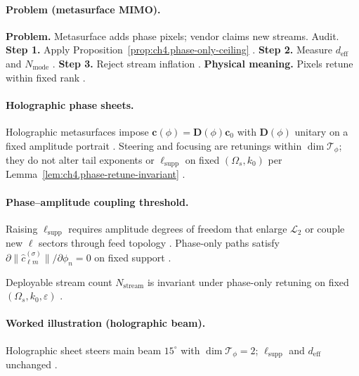 \paragraph{Problem (metasurface MIMO).}
\textbf{Problem.} Metasurface adds phase pixels; vendor claims new streams. Audit.
\textbf{Step 1.} Apply Proposition~\ref{prop:ch4.phase-only-ceiling} \cite{stratton1941,harrington2001}.
\textbf{Step 2.} Measure \(d_{\mathrm{eff}}\) and \(N_{\mathrm{mode}}\) \cite{hansen1988,devaney2004}.
\textbf{Step 3.} Reject stream inflation \cite{jackson1999,collin2001}.
\textbf{Physical meaning.} Pixels retune within fixed rank \cite{harrington2001}.

\paragraph{Holographic phase sheets.}
Holographic metasurfaces impose \(\mathbf{c}(\phi)=\mathbf{D}(\phi)\mathbf{c}_{0}\) with \(\mathbf{D}(\phi)\) unitary on a fixed amplitude portrait
\cite{stratton1941,harrington2001,collin2001}. Steering and focusing are retunings within \(\dim\mathcal{T}_{\phi}\); they do not alter tail exponents or
\(\ell_{\mathrm{supp}}\) on fixed \((\Omega_{s},k_{0})\) per Lemma~\ref{lem:ch4.phase-retune-invariant} \cite{hansen1988,jackson1999,devaney2004}.

\paragraph{Phase--amplitude coupling threshold.}
Raising \(\ell_{\mathrm{supp}}\) requires amplitude degrees of freedom that enlarge \(\mathcal{L}_{2}\) or couple new \(\ell\) sectors through feed topology
\cite{harrington2001,stratton1941,devaney2004}. Phase-only paths satisfy \(\partial\|\widehat{c}_{\ell m}^{(\sigma)}\|/\partial\phi_{n}=0\) on fixed support
\cite{hansen1988,jackson1999,collin2001}.

\begin{corollary}
\label{cor:ch4.phase-mimo-invariant}
Deployable stream count \(N_{\mathrm{stream}}\) is invariant under phase-only retuning on fixed \((\Omega_{s},k_{0},\varepsilon)\)
\cite{harrington2001,devaney2004,hansen1988,stratton1941,jackson1999,collin2001}.
\end{corollary}

\paragraph{Worked illustration (holographic beam).}
Holographic sheet steers main beam \(15^{\circ}\) with \(\dim\mathcal{T}_{\phi}=2\); \(\ell_{\mathrm{supp}}\) and \(d_{\mathrm{eff}}\) unchanged
\cite{stratton1941,collin2001,hansen1988,harrington2001,devaney2004}.

